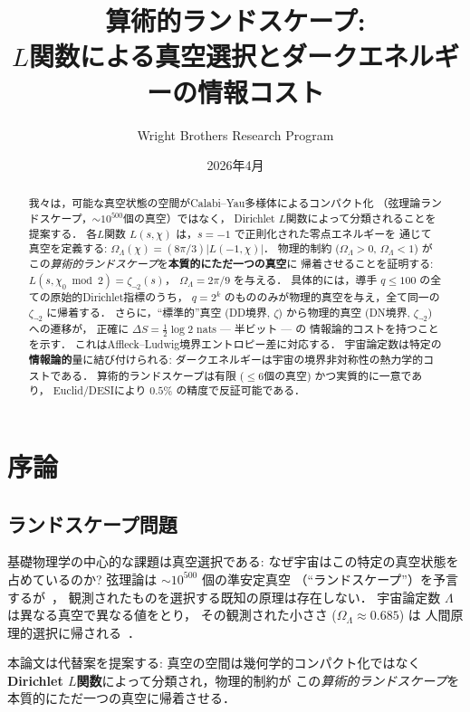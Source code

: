 \documentclass[11pt,a4paper]{article}
\title{算術的ランドスケープ:\\
$L$関数による真空選択とダークエネルギーの情報コスト}
\author{Wright Brothers Research Program}
\date{2026年4月}
\begin{document}
\maketitle

\begin{abstract}
我々は，可能な真空状態の空間がCalabi--Yau多様体によるコンパクト化
（弦理論ランドスケープ，$\sim 10^{500}$個の真空）ではなく，
Dirichlet $L$関数によって分類されることを提案する．
各$L$関数 $L(s, \chi)$ は，$s = -1$ で正則化された零点エネルギーを
通じて真空を定義する:
$\Omega_\Lambda(\chi) = (8\pi/3)|L(-1, \chi)|$．
物理的制約 ($\Omega_\Lambda > 0$, $\Omega_\Lambda < 1$) が
この\emph{算術的ランドスケープ}を\textbf{本質的にただ一つの真空}に
帰着させることを証明する:
$L(s, \chi_0 \bmod 2) = \zeta_{\neg 2}(s)$，
$\Omega_\Lambda = 2\pi/9$ を与える．
具体的には，導手 $q \leq 100$ の全ての原始的Dirichlet指標のうち，
$q = 2^k$ のもののみが物理的真空を与え，全て同一の $\zeta_{\neg 2}$ に帰着する．
さらに，``標準的''真空 (DD境界, $\zeta$) から物理的真空
(DN境界, $\zeta_{\neg 2}$) への遷移が，
正確に $\Delta S = \frac{1}{2}\log 2$ nats --- 半ビット --- の
情報論的コストを持つことを示す．
これはAffleck--Ludwig境界エントロピー差に対応する．
宇宙論定数は特定の\textbf{情報論的}量に結び付けられる:
ダークエネルギーは宇宙の境界非対称性の熱力学的コストである．
算術的ランドスケープは有限 ($\leq 6$個の真空) かつ実質的に一意であり，
Euclid/DESIにより $0.5\%$ の精度で反証可能である．
\end{abstract}

\section{序論}

\subsection{ランドスケープ問題}

基礎物理学の中心的な課題は真空選択である:
なぜ宇宙はこの特定の真空状態を占めているのか?
弦理論は $\sim 10^{500}$ 個の準安定真空
（``ランドスケープ''）を予言するが~\cite{Susskind2003,KKLT2003}，
観測されたものを選択する既知の原理は存在しない．
宇宙論定数 $\Lambda$ は異なる真空で異なる値をとり，
その観測された小ささ ($\Omega_\Lambda \approx 0.685$) は
人間原理的選択に帰される~\cite{Weinberg1987}．

本論文は代替案を提案する: 真空の空間は幾何学的コンパクト化ではなく
\textbf{Dirichlet $L$関数}によって分類され，物理的制約が
この\emph{算術的ランドスケープ}を本質的にただ一つの真空に帰着させる．
\end{document}
